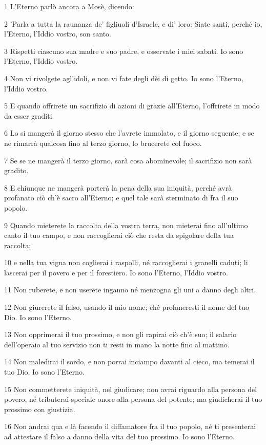\par 1 L'Eterno parlò ancora a Mosè, dicendo:
\par 2 'Parla a tutta la raunanza de' figliuoli d'Israele, e di' loro: Siate santi, perché io, l'Eterno, l'Iddio vostro, son santo.
\par 3 Rispetti ciascuno sua madre e suo padre, e osservate i miei sabati. Io sono l'Eterno, l'Iddio vostro.
\par 4 Non vi rivolgete agl'idoli, e non vi fate degli dèi di getto. Io sono l'Eterno, l'Iddio vostro.
\par 5 E quando offrirete un sacrifizio di azioni di grazie all'Eterno, l'offrirete in modo da esser graditi.
\par 6 Lo si mangerà il giorno stesso che l'avrete immolato, e il giorno seguente; e se ne rimarrà qualcosa fino al terzo giorno, lo brucerete col fuoco.
\par 7 Se se ne mangerà il terzo giorno, sarà cosa abominevole; il sacrifizio non sarà gradito.
\par 8 E chiunque ne mangerà porterà la pena della sua iniquità, perché avrà profanato ciò ch'è sacro all'Eterno; e quel tale sarà sterminato di fra il suo popolo.
\par 9 Quando mieterete la raccolta della vostra terra, non mieterai fino all'ultimo canto il tuo campo, e non raccoglierai ciò che resta da spigolare della tua raccolta;
\par 10 e nella tua vigna non coglierai i raspolli, né raccoglierai i granelli caduti; li lascerai per il povero e per il forestiero. Io sono l'Eterno, l'Iddio vostro.
\par 11 Non ruberete, e non userete inganno né menzogna gli uni a danno degli altri.
\par 12 Non giurerete il falso, usando il mio nome; ché profaneresti il nome del tuo Dio. Io sono l'Eterno.
\par 13 Non opprimerai il tuo prossimo, e non gli rapirai ciò ch'è suo; il salario dell'operaio al tuo servizio non ti resti in mano la notte fino al mattino.
\par 14 Non maledirai il sordo, e non porrai inciampo davanti al cieco, ma temerai il tuo Dio. Io sono l'Eterno.
\par 15 Non commetterete iniquità, nel giudicare; non avrai riguardo alla persona del povero, né tributerai speciale onore alla persona del potente; ma giudicherai il tuo prossimo con giustizia.
\par 16 Non andrai qua e là facendo il diffamatore fra il tuo popolo, né ti presenterai ad attestare il falso a danno della vita del tuo prossimo. Io sono l'Eterno.
